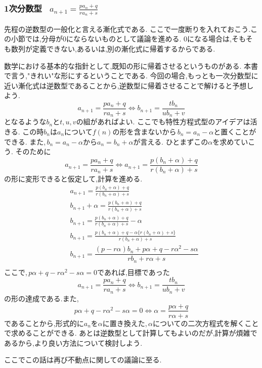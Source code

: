 \documentclass[dvipdfmx,a4paper,11pt,fleqn,openany]{jsbook}
\begin{document}
    \subsubsection{1次分数型 \, $\displaystyle a_{n+1}=\frac{pa_n+q}{ra_n+s}$}
      先程の逆数型の一般化と言える漸化式である.
      ここで一度断りを入れておこう.この小節では,分母が0にならないものとして議論を進める.
      0になる場合は,そもそも数列が定義できない,あるいは,別の漸化式に帰着するからである.

      数学における基本的な指針として,既知の形に帰着させるというものがある.
      本書で言う,"きれい"な形にするということである.
      今回の場合,もっとも一次分数型に近い漸化式は逆数型であることから,逆数型に帰着させることで解けると予想しよう.
      \[
        a_{n+1}=\frac{pa_n+q}{ra_n+s} \Leftrightarrow b_{n+1}=\frac{tb_n}{u b_n+v} 
      \]
      となるような$b_n$と$t,u,v$の組があればよい.
      ここでも特性方程式型のアイデアは活きる.
      この時$b_n$は$a_n$について$f(n)$の形を含まないから\,$b_n=a_n-\alpha$と置くことができる. 
      また,\,$b_n=a_n-\alpha$から$a_n=b_n+\alpha$が言える.
      ひとまずこの$\alpha$を求めていこう.
      そのために
      \[
        a_{n+1}=\frac{pa_n+q}{ra_n+s} \Leftrightarrow a_{n+1}=\frac{p(b_n+\alpha)+q}{r(b_n+\alpha)+s}
      \]
      の形に変形できると仮定して,計算を進める.
      \begin{align*}
        &a_{n+1}=\frac{p(b_n+\alpha)+q}{r(b_n+\alpha)+s}\\
        &b_{n+1}+\alpha=\frac{p(b_n+\alpha)+q}{r(b_n+\alpha)+s}\\
        &b_{n+1}=\frac{p(b_n+\alpha)+q}{r(b_n+\alpha)+s}-\alpha\\
        &b_{n+1}=\frac{p(b_n+\alpha)+q-\alpha\{r(b_n+\alpha)+s\}}{r(b_n+\alpha)+s}\\
        &b_{n+1}=\dfrac{(p-r\alpha)b_{n}+p\alpha+q-r\alpha^{2}-s\alpha}{rb_{n}+r\alpha+s}\\
      \end{align*}
      ここで,\,$p\alpha+q-r\alpha^{2}-s\alpha=0$であれば,目標であった
      \[
        a_{n+1}=\frac{pa_n+q}{ra_n+s} \Leftrightarrow b_{n+1}=\frac{tb_n}{u b_n+v} 
      \]
      の形の達成である.また,
      \[
        p\alpha+q-r\alpha^{2}-s\alpha=0 \Leftrightarrow \alpha=\frac{p\alpha+q}{r\alpha+s}
      \]
      であることから,形式的に$a_n$を$\alpha$に置き換えた,\,$\alpha$についての二次方程式を解くことで求めることができる.
      あとは逆数型として計算してもよいのだが,計算が煩雑であるから,より良い方法について検討しよう.

      ここでこの話は再び不動点に関しての議論に至る.
  
\end{document}
